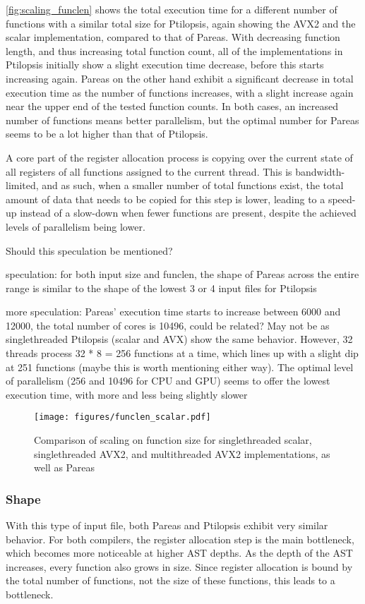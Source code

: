 \documentclass[11pt,dvipsnames]{article}
\newcommand{\helpme}[1]{{\color{red}#1}}
\begin{document}
\autoref{fig:scaling_funclen} shows the total execution time for a different number of functions with a similar total size for Ptilopsis, again showing the AVX2 and the scalar implementation, compared to that of Pareas. With decreasing function length, and thus increasing total function count, all of the implementations in Ptilopsis initially show a slight execution time decrease, before this starts increasing again. Pareas on the other hand exhibit a significant decrease in total execution time as the number of functions increases, with a slight increase again near the upper end of the tested function counts. In both cases, an increased number of functions means better parallelism, but the optimal number for Pareas seems to be a lot higher than that of Ptilopsis.

A core part of the register allocation process is copying over the current state of all registers of all functions assigned to the current thread. This is bandwidth-limited, and as such, when a smaller number of total functions exist, the total amount of data that needs to be copied for this step is lower, leading to a speed-up instead of a slow-down when fewer functions are present, despite the achieved levels of parallelism being lower. 

\helpme{Should this speculation be mentioned?}

\helpme{speculation: for both input size and funclen, the shape of Pareas across the entire range is similar to the shape of the lowest 3 or 4 input files for Ptilopsis}

\helpme{more speculation: Pareas' execution time starts to increase between 6000 and 12000, the total number of cores is 10496, could be related? May not be as singlethreaded Ptilopsis (scalar and AVX) show the same behavior. However, 32 threads process 32 * 8 = 256 functions at a time, which lines up with a slight dip at 251 functions (maybe this is worth mentioning either way). The optimal level of parallelism (256 and 10496 for CPU and GPU) seems to offer the lowest execution time, with more and less being slightly slower}

\begin{figure}[ht]
    \centering
    \texttt{[image: figures/funclen\_scalar.pdf]}
    \caption{Comparison of scaling on function size for singlethreaded scalar, singlethreaded AVX2, and multithreaded AVX2 implementations, as well as Pareas}
    \label{fig:scaling_funclen}
\end{figure}

\subsubsection*{Shape}
With this type of input file, both Pareas and Ptilopsis exhibit very similar behavior. For both compilers, the register allocation step is the main bottleneck, which becomes more noticeable at higher AST depths. As the depth of the AST increases, every function also grows in size. Since register allocation is bound by the total number of functions, not the size of these functions, this leads to a bottleneck.
\end{document}
